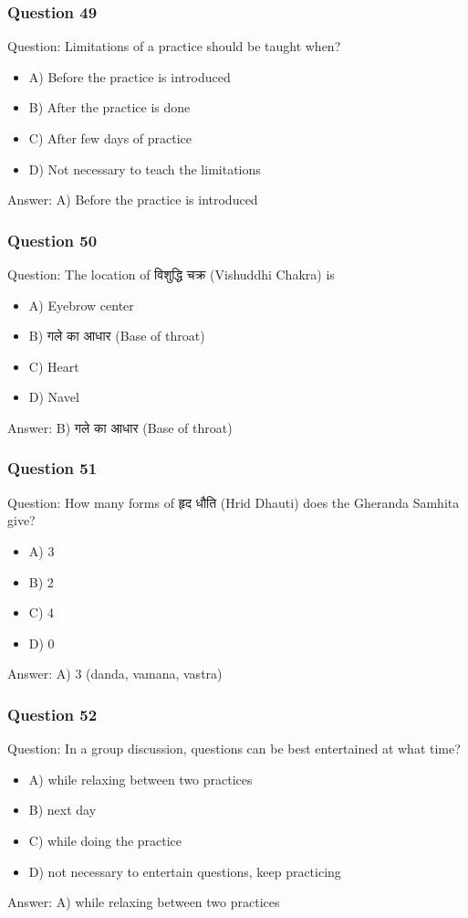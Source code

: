 \begin{frame}[fragile]\frametitle{Question 49}
Question: Limitations of a practice should be taught when?
\begin{itemize}
\item A) Before the practice is introduced
\item B) After the practice is done
\item C) After few days of practice
\item D) Not necessary to teach the limitations
\end{itemize}
Answer: A) Before the practice is introduced
\end{frame}

\begin{frame}[fragile]\frametitle{Question 50}
Question: The location of विशुद्धि चक्र (Vishuddhi Chakra) is
\begin{itemize}
\item A) Eyebrow center
\item B) गले का आधार (Base of throat)
\item C) Heart
\item D) Navel
\end{itemize}
Answer: B) गले का आधार (Base of throat)
\end{frame}

\begin{frame}[fragile]\frametitle{Question 51}
Question: How many forms of हृद धौति (Hrid Dhauti) does the Gheranda Samhita give?
\begin{itemize}
\item A) 3
\item B) 2
\item C) 4
\item D) 0
\end{itemize}
Answer: A) 3 (danda, vamana, vastra)
\end{frame}

\begin{frame}[fragile]\frametitle{Question 52}
Question: In a group discussion, questions can be best entertained at what time?
\begin{itemize}
\item A) while relaxing between two practices
\item B) next day
\item C) while doing the practice
\item D) not necessary to entertain questions, keep practicing
\end{itemize}
Answer: A) while relaxing between two practices
\end{frame}


